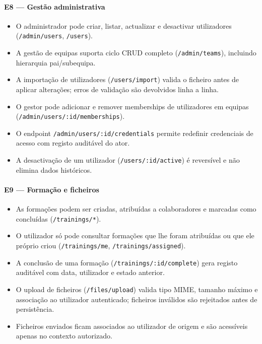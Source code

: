 \documentclass[11pt,a4paper,twoside]{article}
\begin{document}
\paragraph{E8 — Gestão administrativa}
\begin{itemize}
  \item O administrador pode criar, listar, actualizar e desactivar utilizadores (\texttt{/admin/users}, \texttt{/users}).
  \item A gestão de equipas suporta ciclo CRUD completo (\texttt{/admin/teams}), incluindo hierarquia pai/subequipa.
  \item A importação de utilizadores (\texttt{/users/import}) valida o ficheiro antes de aplicar alterações; erros de validação são devolvidos linha a linha.
  \item O gestor pode adicionar e remover memberships de utilizadores em equipas (\texttt{/admin/users/\newline:id/memberships}).
  \item O endpoint \texttt{/admin/users/:id/credentials} permite redefinir credenciais de acesso com registo auditável do ator.
  \item A desactivação de um utilizador (\texttt{/users/:id/active}) é reversível e não elimina dados históricos.
\end{itemize}

\paragraph{E9 — Formação e ficheiros}
\begin{itemize}
  \item As formações podem ser criadas, atribuídas a colaboradores e marcadas como concluídas (\texttt{/trainings/*}).
  \item O utilizador só pode consultar formações que lhe foram atribuídas ou que ele próprio criou (\texttt{/trainings/me}, \texttt{/trainings/assigned}).
  \item A conclusão de uma formação (\texttt{/trainings/:id/complete}) gera registo auditável com data, utilizador e estado anterior.
  \item O upload de ficheiros (\texttt{/files/upload}) valida tipo MIME, tamanho máximo e associação ao utilizador autenticado; ficheiros inválidos são rejeitados antes de persistência.
  \item Ficheiros enviados ficam associados ao utilizador de origem e são acessíveis apenas no contexto autorizado.
\end{itemize}
\end{document}
